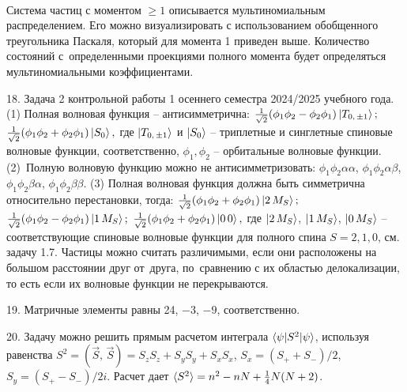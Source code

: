 \quad\quad
{}
\vspace{-\parskip}
\\
Система частиц с моментом $\geq1$ описывается мультиномиальным распределением. Его можно визуализировать с использованием обобщенного треугольника Паскаля, который для момента 1 приведен выше. Количество состояний с~определенными проекциями полного момента будет определяться мультиномиальными коэффициентами.\par
18. Задача 2 контрольной работы 1 осеннего семестра 2024/2025 учебного года. (1) Полная волновая функция – антисимметрична: $\frac{1}{\sqrt{2}}(\phi_1\phi_2-\phi_2\phi_1)\ket{T_{0,\,\pm1}};$ $\frac{1}{\sqrt{2}}(\phi_1\phi_2+\phi_2\phi_1)\ket{S_{0}},$ где $\ket{T_{0,\,\pm1}}$ и $\ket{S_{0}}$ – триплетные и синглетные спиновые волновые функции, соответственно, $\phi_1, \phi_2$ – орбитальные волновые функции. (2)~Полную волновую функцию можно не антисимметризовать: $\phi_1\phi_2\alpha\alpha$, $\phi_1\phi_2\alpha\beta$, $\phi_1\phi_2\beta\alpha$, $\phi_1\phi_2\beta\beta$. (3) Полная волновая функция должна быть симметрична относительно перестановки, тогда: $\frac{1}{\sqrt{2}}(\phi_1\phi_2+\phi_2\phi_1)\ket{2\,M_S};$ $\frac{1}{\sqrt{2}}(\phi_1\phi_2-\phi_2\phi_1)\ket{1\,M_S};$ $\frac{1}{\sqrt{2}}(\phi_1\phi_2+\phi_2\phi_1)\ket{0\,0},$ где $\ket{2\, M_S}$, $\ket{1\, M_S}$, $\ket{0\, M_S}$ – соответствующие спиновые волновые функции для полного спина $S=2,1,0$, см. задачу 1.7. Частицы можно считать различимыми, если они расположены на большом расстоянии друг от~друга, по~сравнению с их областью делокализации, то есть если их волновые функции не перекрываются.\par
19. Матричные элементы равны 24, $-3$, $-9$, соответственно.\par
20. Задачу можно решить прямым расчетом интеграла $\braket{\psi|{S}^2|\psi}$, используя равенства ${S}^2 = (\vec{S},\,\vec{S})=S_{z}S_{z}+S_{y}S_{y}+S_{x}S_{x}$, $S_x=(S_+ + S_-)/2$, $S_y=(S_+ - S_-)/2i$. Расчет дает $\braket{{S}^2} = n^2 - nN + \frac{1}{4}N(N+2)$.\par
\newpage

